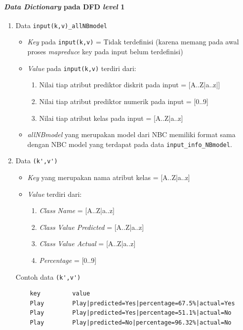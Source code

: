 \paragraph{\textit{Data Dictionary} pada DFD \textit{level} 1}
\begin{enumerate}
	\item{Data \verb|input(k,v)_allNBmodel|}
	\begin{itemize}
		\item \textit{Key} pada \verb|input(k,v)| = Tidak terdefinisi (karena memang pada awal proses \textit{mapreduce} key pada input belum terdefinisi)

		\item \textit{Value} pada \verb|input(k,v)| terdiri dari:
		\begin{enumerate}
			\item Nilai tiap atribut prediktor diskrit pada input = [A..Z|a..z|]
			\item Nilai tiap atribut prediktor numerik pada input = [0..9]
			\item Nilai tiap atribut kelas pada input = [A..Z|a..z]
		\end{enumerate}

		\item \textit{allNBmodel} yang merupakan model dari NBC memiliki format sama dengan NBC model yang terdapat pada data \verb|input_info_NBmodel|.
		
	\end{itemize}
	
	\item{Data \verb|(k',v')|}
	\begin{itemize}
		\item \textit{Key} yang merupakan nama atribut kelas = [A..Z|a..z]
		\item \textit{Value} terdiri dari:
		\begin{enumerate}
			\item \textit{Class Name} = [A..Z|a..z]
			\item \textit{Class Value Predicted} = [A..Z|a..z]
			\item \textit{Class Value Actual} = [A..Z|a..z]
			\item \textit{Percentage} = [0..9]
		\end{enumerate}
	\end{itemize}
	Contoh data \verb|(k',v')|
	\begin{lstlisting}
	key			value
	Play		Play|predicted=Yes|percentage=67.5%|actual=Yes
	Play		Play|predicted=Yes|percentage=51.1%|actual=No
	Play		Play|predicted=No|percentage=96.32%|actual=No	
	\end{lstlisting}


\end{enumerate}
